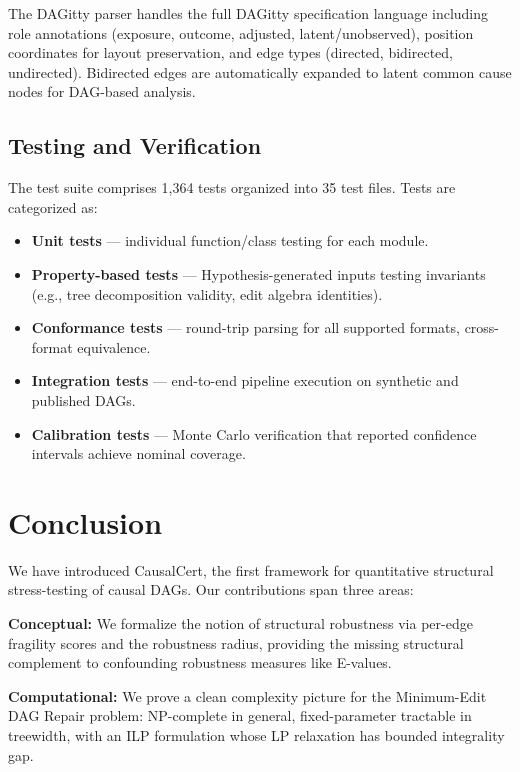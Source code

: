 \documentclass[11pt,a4paper]{article}
\theoremstyle{definition}
\theoremstyle{remark}
\begin{document}
The DAGitty parser handles the full DAGitty specification language including
role annotations (exposure, outcome, adjusted, latent/unobserved), position
coordinates for layout preservation, and edge types (directed, bidirected,
undirected). Bidirected edges are automatically expanded to latent common
cause nodes for DAG-based analysis.

\subsection{Testing and Verification}\label{sec:testing}

The test suite comprises 1{,}364 tests organized into 35 test files. Tests
are categorized as:
\begin{itemize}
  \item \textbf{Unit tests} --- individual function/class testing for each module.
  \item \textbf{Property-based tests} --- Hypothesis-generated inputs testing
    invariants (e.g., tree decomposition validity, edit algebra identities).
  \item \textbf{Conformance tests} --- round-trip parsing for all supported
    formats, cross-format equivalence.
  \item \textbf{Integration tests} --- end-to-end pipeline execution on
    synthetic and published DAGs.
  \item \textbf{Calibration tests} --- Monte Carlo verification that reported
    confidence intervals achieve nominal coverage.
\end{itemize}

\section{Conclusion}\label{sec:conclusion}

We have introduced CausalCert, the first framework for quantitative structural
stress-testing of causal DAGs. Our contributions span three areas:

\textbf{Conceptual:} We formalize the notion of structural robustness via per-edge
fragility scores and the robustness radius, providing the missing structural complement
to confounding robustness measures like E-values.

\textbf{Computational:} We prove a clean complexity picture for the Minimum-Edit DAG
Repair problem: NP-complete in general, fixed-parameter tractable in treewidth, with
an ILP formulation whose LP relaxation has bounded integrality gap.
\end{document}
